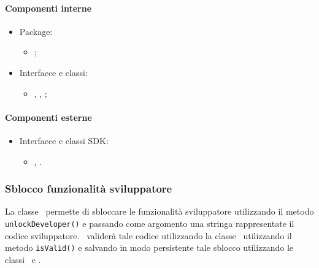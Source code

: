 \documentclass[../Funzionalita.tex]{subfiles}
\begin{document}
			\paragraph*{Componenti interne}
			\begin{itemize}
			
				\item Package:
				\begin{itemize}
					\item[] \usersetting;
				\end{itemize}
				
				\item Interfacce e classi:
				\begin{itemize}
					\item[] \Setting, \SettingImp, \PathPreference;
				\end{itemize}
				
			\end{itemize}
			
			
			\paragraph*{Componenti esterne}
			
			\begin{itemize}
				\item Interfacce e classi SDK:
				\begin{itemize}
					\item[] \SharedPreferences, \SharedPreferenceEditor.
				\end{itemize}
			\end{itemize}
						
		
		\subsubsection{Sblocco funzionalità sviluppatore}
			La classe \SettingImp\ permette di sbloccare le funzionalità sviluppatore utilizzando il metodo \lstinline|unlockDeveloper()| e passando come argomento una stringa rappresentate il codice sviluppatore. \SettingImp\ validerà tale codice utilizzando la classe \DeveloperCodeManager\ utilizzando il metodo \lstinline|isValid()| e salvando in modo persistente tale sblocco utilizzando le classi \SharedPreferences\ e \SharedPreferenceEditor.
		
\end{document}
